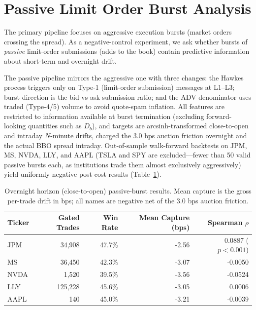 \documentclass[11pt]{article}
\begin{document}
\appendix
\section{Passive Limit Order Burst Analysis}
\label{sec:appendix_passive}

The primary pipeline focuses on aggressive execution bursts (market orders crossing the spread). As a negative-control experiment, we ask whether bursts of \emph{passive} limit-order submissions (adds to the book) contain predictive information about short-term and overnight drift.

The passive pipeline mirrors the aggressive one with three changes: the Hawkes process triggers only on Type-1 (limit-order submission) messages at L1--L3; burst direction is the bid-vs-ask submission ratio; and the ADV denominator uses traded (Type-4/5) volume to avoid quote-spam inflation. All features are restricted to information available at burst termination (excluding forward-looking quantities such as $D_b$), and targets are arcsinh-transformed close-to-open and intraday $N$-minute drifts, charged the 3.0 bps auction friction overnight and the actual BBO spread intraday. Out-of-sample walk-forward backtests on JPM, MS, NVDA, LLY, and AAPL (TSLA and SPY are excluded---fewer than 50 valid passive bursts each, as institutions trade them almost exclusively aggressively) yield uniformly negative post-cost results (Table~\ref{tab:passive_overnight}).

\begin{table}[h]
\centering
\begin{tabular}{lrrrr}
\toprule
\textbf{Ticker} & \textbf{Gated Trades} & \textbf{Win Rate} & \textbf{Mean Capture (bps)} & \textbf{Spearman $\rho$} \\
\midrule
JPM & 34,908 & 47.7\% & -2.56 & 0.0887 ($p<0.001$) \\
MS & 36,450 & 42.3\% & -3.07 & -0.0050 \\
NVDA & 1,520 & 39.5\% & -3.56 & -0.0524 \\
LLY & 125,228 & 45.6\% & -3.05 & 0.0006 \\
AAPL & 140 & 45.0\% & -3.21 & -0.0039 \\
\bottomrule
\end{tabular}
\caption{Overnight horizon (close-to-open) passive-burst results. Mean capture is the gross per-trade drift in bps; all names are negative net of the 3.0 bps auction friction.}
\label{tab:passive_overnight}
\end{table}
\end{document}
